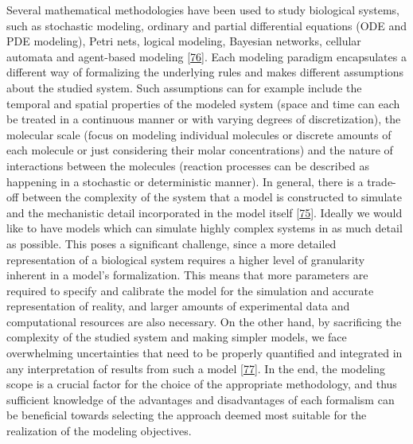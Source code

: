 \documentclass[
  12pt,
]{book}
\begin{document}
Several mathematical methodologies have been used to study biological systems, such as stochastic modeling, ordinary and partial differential equations (ODE and PDE modeling), Petri nets, logical modeling, Bayesian networks, cellular automata and agent-based modeling {[}\protect\hyperlink{ref-ElKalaawy2015}{76}{]}.
Each modeling paradigm encapsulates a different way of formalizing the underlying rules and makes different assumptions about the studied system.
Such assumptions can for example include the temporal and spatial properties of the modeled system (space and time can each be treated in a continuous manner or with varying degrees of discretization), the molecular scale (focus on modeling individual molecules or discrete amounts of each molecule or just considering their molar concentrations) and the nature of interactions between the molecules (reaction processes can be described as happening in a stochastic or deterministic manner).
In general, there is a trade-off between the complexity of the system that a model is constructed to simulate and the mechanistic detail incorporated in the model itself {[}\protect\hyperlink{ref-Aldridge2006}{75}{]}.
Ideally we would like to have models which can simulate highly complex systems in as much detail as possible.
This poses a significant challenge, since a more detailed representation of a biological system requires a higher level of granularity inherent in a model's formalization.
This means that more parameters are required to specify and calibrate the model for the simulation and accurate representation of reality, and larger amounts of experimental data and computational resources are also necessary.
On the other hand, by sacrificing the complexity of the studied system and making simpler models, we face overwhelming uncertainties that need to be properly quantified and integrated in any interpretation of results from such a model {[}\protect\hyperlink{ref-Groen2021}{77}{]}.
In the end, the modeling scope is a crucial factor for the choice of the appropriate methodology, and thus sufficient knowledge of the advantages and disadvantages of each formalism can be beneficial towards selecting the approach deemed most suitable for the realization of the modeling objectives.
\end{document}
